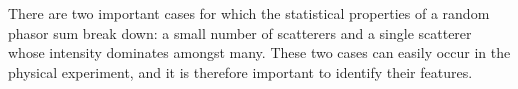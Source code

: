 There are two important cases for which the statistical properties of a random
phasor sum break down: a small number of scatterers and a single scatterer
whose intensity dominates amongst many.  These two cases can easily occur in
the physical experiment, and it is therefore important to identify their
features.
